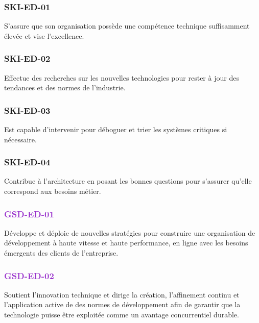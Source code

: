 \documentclass[a4paper, french, openany, 12pt]{book}
\newcommand\dex[1]{\textcolor{BrickRed}{\textbf{\uppercase{ski-{#1}}}}}
\newcommand\str[1]{\textcolor{DarkOrchid}{\textbf{\uppercase{gsd-{#1}}}}}
\begin{document}
\begin{multicols}{2}

  \subsubsection*{\dex{ed-01}}

  S'assure que son organisation possède une compétence technique suffisamment élevée et vise l'excellence.

  \subsubsection*{\dex{ed-02}}

  Effectue des recherches sur les nouvelles technologies pour rester à jour des tendances et des normes de l'industrie.

  \subsubsection*{\dex{ed-03}}

  Est capable d'intervenir pour déboguer et trier les systèmes critiques si nécessaire.

  \subsubsection*{\dex{ed-04}}

  Contribue à l'architecture en posant les bonnes questions pour s'assurer qu'elle correspond aux besoins métier.

  \subsubsection*{\str{ed-01}}

  Développe et déploie de nouvelles stratégies pour construire une organisation de développement à haute vitesse et haute 
  performance, en ligne avec les besoins émergents des clients de l'entreprise.

  \subsubsection*{\str{ed-02}}

  Soutient l'innovation technique et dirige la création, l'affinement continu et l'application active de des normes de 
  développement afin de garantir que la technologie puisse être exploitée comme un avantage concurrentiel durable.


\end{multicols}
\end{document}
